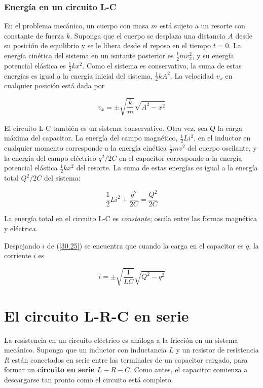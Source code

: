 \subsubsection{Energía en un circuito L-C}
En el problema mecánico, un cuerpo con masa $m$ está sujeto a un resorte con constante de fuerza $k$. Suponga que el cuerpo se desplaza una distancia $A$ desde su posición de equilibrio y se le libera desde el reposo en el tiempo $t=0$. La energía cinética del sistema en un isntante posterior es 	$\frac{1}{2}mv_x^2$, y su energía potencial elástica es $\frac{1}{2}kx^2$. Como el sistema es conservativo, la suma de estas energías es igual a la energía inicial del sistema, $\frac{1}{2}kA^2$. La velocidad $v_x$ en cualquier posición está dada por

\begin{equation}\label{30.24}
v_x=\pm\sqrt{\frac{k}{m}}\sqrt{A^2-x^2}
\end{equation}

El circuito L-C también es un sistema conservativo. Otra vez, sea $Q$ la carga máxima del capacitor. La energía del campo magnético, $\frac{1}{2}Li^2$, en el inductor en cualquier momento corresponde a la energía cinética $\frac{1}{2}mv^2$ del cuerpo oscilante, y la energía del campo eléctrico $q^2/2C$ en el capacitor corresponde a la energía potencial elástica $\frac{1}{2}kx^2$ del resorte. La suma de estas energías es igual a la energía total $Q^2/2C$ del sistema:

\begin{equation}\label{30.25}
\frac{1}{2}Li^2+\frac{q^2}{2C}=\frac{Q^2}{2C}
\end{equation}

La energía total en el circuito L-C es \textit{constante}; oscila entre las formas magnética y eléctrica.

Despejando $i$ de (\ref{30.25}) se encuentra que cuando la carga en el capacitor es $q$, la corriente $i$ es

\begin{equation}\label{30.26}
i=\pm\sqrt{\frac{1}{LC}}\sqrt{Q^2-q^2}
\end{equation}

\section{El circuito L-R-C en serie}
La resistencia en un circuito eléctrico es análoga a la fricción en un sistema mecánico. Suponga que un inductor con inductancia $L$ y un resistor de resistencia $R$ están conectados en serie entre las terminales de un capacitor cargado, para formar un \textbf{circuito en serie $L-R-C$}. Como antes, el capacitor comienza a descargarse tan pronto como el circuito está completo.

